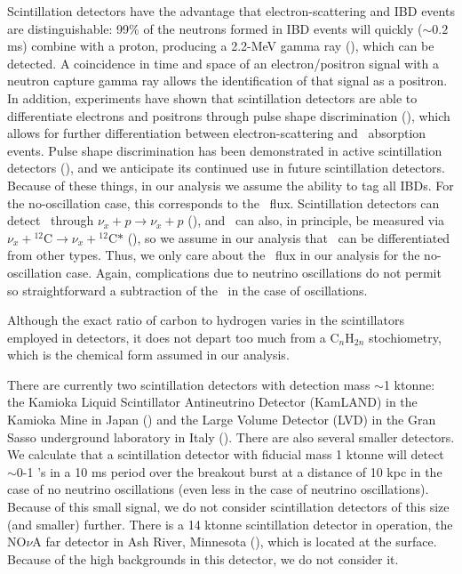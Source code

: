 Scintillation detectors have the advantage that electron-scattering 
and IBD events are distinguishable: 99\% of the neutrons formed in IBD
events will quickly (${\sim}0.2$ ms) 
combine with a proton, producing a
2.2-MeV gamma ray (\citealt{abeetal2008}), which can be detected.  
A coincidence in time and space of an electron/positron signal with a
neutron capture gamma ray allows the identification of that signal as
a positron.
 In addition, experiments have shown that
scintillation detectors are able to differentiate electrons
and positrons through pulse shape discrimination 
(\citealp{kinoetal2000,francoetal2011}), which
allows for further differentiation between electron-scattering
and \anue\ absorption events.  Pulse shape discrimination 
has been demonstrated in active scintillation detectors
(\citealp{abeetal2014,bellinietal2014}), and we anticipate its
continued use in future scintillation detectors.  Because of these
things, in our analysis we assume the ability to tag all IBDs.  For
the no-oscillation case, this corresponds to the \anue\ flux.
Scintillation detectors can detect
\nux\ through $\nu_x + p \rightarrow \nu_x + p$
(\citealp{oberaueretal2005,lahabeacom2014}), and  \nux\ can also, in
principle, be measured via $\nu_x + {^{12}}\textrm{C} \rightarrow  
\nu_x + {^{12}}\textrm{C*}$ (\citealt{ryazhskaya1992}), so we assume in
our analysis that \nux\ can be differentiated from other types.  Thus,
we only care about the \nue\ flux in our analysis for the
no-oscillation case.  Again, complications due to neutrino
oscillations do not permit so straightforward a subtraction of the
\backgrounds\ in the case of oscillations.


Although the exact ratio of carbon to hydrogen varies in 
the scintillators employed in detectors, 
it does not depart too much from a
C$_{n}$H$_{2n}$ stochiometry, which is the chemical form 
assumed in our analysis.

There are currently two scintillation detectors with detection mass
$\sim$1 ktonne: the Kamioka Liquid Scintillator Antineutrino Detector
(KamLAND) in the Kamioka Mine in Japan
(\citealt{eguchietal2003}) and the Large Volume Detector (LVD) in 
the Gran Sasso underground laboratory in 
Italy (\citealt{agliettaetal1992}). There are also several smaller detectors.
We calculate 
that a scintillation detector with fiducial mass 1 ktonne will detect 
$\sim$0-1 \nue's in a 10 ms period over the
breakout burst at a distance of 10 kpc in the case of no neutrino
oscillations (even less in the case of neutrino oscillations). 
Because of this small signal,
we do not consider scintillation detectors of this size (and smaller) further.
There is a 14 ktonne
scintillation detector in operation, the NO$\nu$A far
detector in Ash River, Minnesota
(\citealt{pattersonetal2012}), which is located at the surface.  
Because of the
high backgrounds in this detector, we do not consider it.

